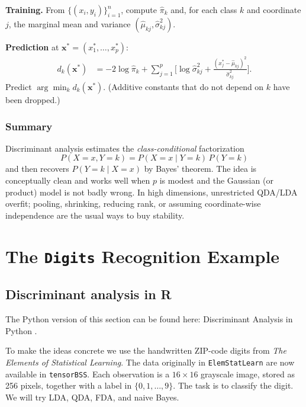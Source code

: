 \documentclass[
]{book}
\begin{document}
\textbf{Training.} From \(\{(x_i, y_i)\}_{i=1}^{n}\), compute \(\hat{\pi}_k\) and, for each class \(k\) and coordinate \(j\), the marginal mean and variance \((\hat{\mu}_{kj}, \hat{\sigma}_{kj}^2)\).

\textbf{Prediction} at \(\mathbf{x}^* = (x_1^*, \ldots, x_p^*)\):
\begin{align*}
d_k(\mathbf{x}^*)
&= -2\log \hat{\pi}_k + \sum_{j=1}^{p}
\Biggl[
\log \hat{\sigma}_{kj}^2 + \frac{(x_j^* - \hat{\mu}_{kj})^2}{\hat{\sigma}_{kj}^2}
\Biggr].
\end{align*}
Predict \(\arg\min_k d_k(\mathbf{x}^*)\). (Additive constants that do not depend on \(k\) have been dropped.)

\subsubsection*{Summary}\label{summary}

Discriminant analysis estimates the \emph{class-conditional} factorization
\[
P(X = x, Y = k) = P(X = x \mid Y = k)\, P(Y = k)
\]
and then recovers \(P(Y = k \mid X = x)\) by Bayes' theorem. The idea is conceptually clean and works well when \(p\) is modest and the Gaussian (or product) model is not badly wrong. In high dimensions, unrestricted QDA/LDA overfit; pooling, shrinking, reducing rank, or assuming coordinate-wise independence are the usual ways to buy stability.

\section{\texorpdfstring{The \texttt{Digits} Recognition Example}{The Digits Recognition Example}}\label{the-digits-recognition-example}

\subsection*{Discriminant analysis in R}\label{discriminant-analysis-in-r}

The Python version of this section can be found here: Discriminant Analysis in Python .

To make the ideas concrete we use the handwritten ZIP-code digits from \emph{The Elements of Statistical Learning}. The data originally in \texttt{ElemStatLearn} are now available in \texttt{tensorBSS}. Each observation is a \(16 \times 16\) grayscale image, stored as 256 pixels, together with a label in \(\{0,1,\ldots,9\}\). The task is to classify the digit. We will try LDA, QDA, FDA, and naive Bayes.
\end{document}
